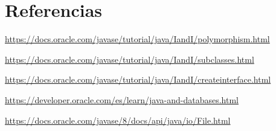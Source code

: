 \documentclass{article}
\begin{document}
\clearpage

\section{Referencias}
    \item \url{https://docs.oracle.com/javase/tutorial/java/IandI/polymorphism.html}
    \item \url{https://docs.oracle.com/javase/tutorial/java/IandI/subclasses.html}
    \item \url{https://docs.oracle.com/javase/tutorial/java/IandI/createinterface.html}
    \item \url{https://developer.oracle.com/es/learn/java-and-databases.html}
    \item \url{https://docs.oracle.com/javase/8/docs/api/java/io/File.html}
	
%
%
%
			
\end{document}
